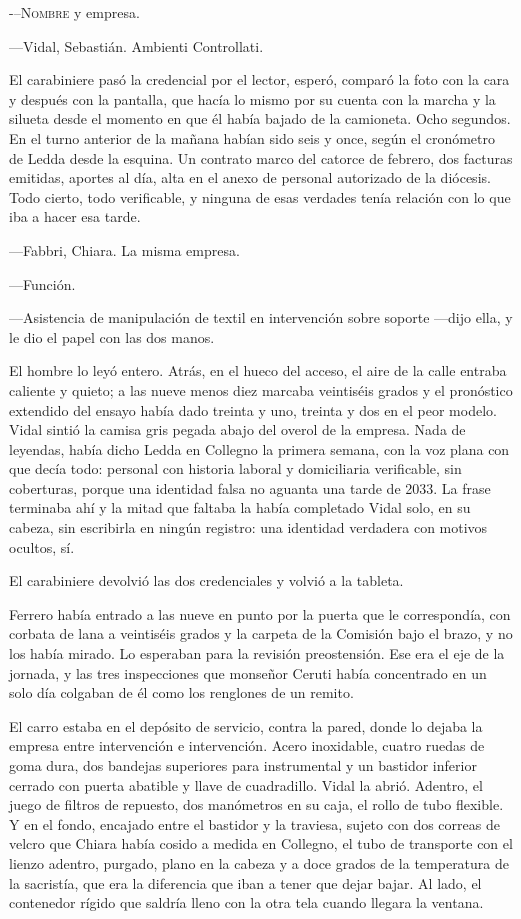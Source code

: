 \lettrine[lines=2, lhang=0.1, nindent=0.2em]{-}{--Nombre} y empresa.


---Vidal, Sebastián. Ambienti Controllati.

El carabiniere pasó la credencial por el lector, esperó, comparó la foto con la cara y después con la pantalla, que hacía lo mismo por su cuenta con la marcha y la silueta desde el momento en que él había bajado de la camioneta. Ocho segundos. En el turno anterior de la mañana habían sido seis y once, según el cronómetro de Ledda desde la esquina. Un contrato marco del catorce de febrero, dos facturas emitidas, aportes al día, alta en el anexo de personal autorizado de la diócesis. Todo cierto, todo verificable, y ninguna de esas verdades tenía relación con lo que iba a hacer esa tarde.

---Fabbri, Chiara. La misma empresa.

---Función.

---Asistencia de manipulación de textil en intervención sobre soporte ---dijo ella, y le dio el papel con las dos manos.

El hombre lo leyó entero. Atrás, en el hueco del acceso, el aire de la calle entraba caliente y quieto; a las nueve menos diez marcaba veintiséis grados y el pronóstico extendido del ensayo había dado treinta y uno, treinta y dos en el peor modelo. Vidal sintió la camisa gris pegada abajo del overol de la empresa. Nada de leyendas, había dicho Ledda en Collegno la primera semana, con la voz plana con que decía todo: personal con historia laboral y domiciliaria verificable, sin coberturas, porque una identidad falsa no aguanta una tarde de 2033. La frase terminaba ahí y la mitad que faltaba la había completado Vidal solo, en su cabeza, sin escribirla en ningún registro: una identidad verdadera con motivos ocultos, sí.

El carabiniere devolvió las dos credenciales y volvió a la tableta.

Ferrero había entrado a las nueve en punto por la puerta que le correspondía, con corbata de lana a veintiséis grados y la carpeta de la Comisión bajo el brazo, y no los había mirado. Lo esperaban para la revisión preostensión. Ese era el eje de la jornada, y las tres inspecciones que monseñor Ceruti había concentrado en un solo día colgaban de él como los renglones de un remito.

El carro estaba en el depósito de servicio, contra la pared, donde lo dejaba la empresa entre intervención e intervención. Acero inoxidable, cuatro ruedas de goma dura, dos bandejas superiores para instrumental y un bastidor inferior cerrado con puerta abatible y llave de cuadradillo. Vidal la abrió. Adentro, el juego de filtros de repuesto, dos manómetros en su caja, el rollo de tubo flexible. Y en el fondo, encajado entre el bastidor y la traviesa, sujeto con dos correas de velcro que Chiara había cosido a medida en Collegno, el tubo de transporte con el lienzo adentro, purgado, plano en la cabeza y a doce grados de la temperatura de la sacristía, que era la diferencia que iban a tener que dejar bajar. Al lado, el contenedor rígido que saldría lleno con la otra tela cuando llegara la ventana.


